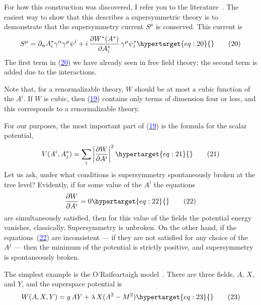 \documentclass[11pt,a4paper]{article}
\newcommand{\eqtarget}[1]{\hypertarget{eq:#1}{\mathstrut}\tag{#1}}
\newcommand{\eqnref}[1]{(\hyperlink{eq:#1}{\textcolor{blue}{#1}})}
\begin{document}
For how this construction was discovered, I refer you to the literature~\cite{ref2}.
The easiest way to show that this describes a supersymmetric
theory is to demonstrate that the supersymmetry current $S^\mu$ is conserved.
This current is
\begin{equation}
S^\mu = \partial_\alpha A_i^* \gamma^\alpha \gamma^\mu \psi^i + i\, \frac{\partial W^*(A^*)}{\partial A_i^*}\, \gamma^\mu \psi_i^*
\eqtarget{20}
\end{equation}
The first term in \eqnref{20} we have already seen in free field theory;
the second term is added due to the interactions.

Note that, for a renormalizable theory, $W$ should be at most a
cubic function of the $A^i$. If $W$ is cubic, then \eqnref{19} contains only
terms of dimension four or less, and this corresponds to a renormalizable
theory.

For our purposes, the most important part of \eqnref{19} is the formula
for the scalar potential,
\begin{equation}
V(A^i, A_j^*) = \sum_i \left|\frac{\partial W}{\partial A^i}\right|^2
\eqtarget{21}
\end{equation}
Let us ask, under what conditions is supersymmetry spontaneously
broken at the tree level? Evidently, if for some value of the $A^i$
the equations
\begin{equation}
\frac{\partial W}{\partial A^i} = 0
\eqtarget{22}
\end{equation}
are simultaneously satisfied, then for this value of the fields the
potential energy vanishes, classically. Supersymmetry is unbroken.
On the other hand, if the equations~\eqnref{22} are inconsistent --- if they
are not satisfied for any choice of the $A^j$ --- then the minimum of the
potential is strictly positive, and supersymmetry is spontaneously
broken.

The simplest example is the O'Raifeartaigh model~\cite{ref9}. There are
three fields, $A$, $X$, and $Y$, and the superspace potential is
\begin{equation}
W(A, X, Y) = g\, A Y + \lambda\, X (A^2 - M^2)
\eqtarget{23}
\end{equation}
\end{document}
